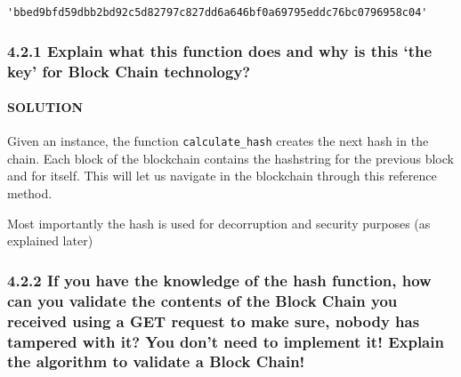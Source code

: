 \documentclass[11pt]{article}
\makeatletter
\newcommand{\boxspacing}{\kern\kvtcb@left@rule\kern\kvtcb@boxsep}
\newcommand{\prompt}[4]{
        {\ttfamily\llap{{\color{#2}[#3]:\hspace{3pt}#4}}\vspace{-\baselineskip}}
    }
\makeatother
\begin{document}
            \begin{tcolorbox}[breakable, size=fbox, boxrule=.5pt, pad at break*=1mm, opacityfill=0]
\prompt{Out}{outcolor}{35}{\boxspacing}
\begin{Verbatim}[commandchars=\\\{\}]
'bbed9bfd59dbb2bd92c5d82797c827dd6a646bf0a69795eddc76bc0796958c04'
\end{Verbatim}
\end{tcolorbox}
        
    \hypertarget{explain-what-this-function-does-and-why-is-this-the-key-for-block-chain-technology}{%
\subsubsection{4.2.1 Explain what this function does and why is this
`the key' for Block Chain
technology?}\label{explain-what-this-function-does-and-why-is-this-the-key-for-block-chain-technology}}

    \hypertarget{solution}{%
\paragraph{SOLUTION}\label{solution}}

Given an instance, the function \texttt{calculate\_hash} creates the
next hash in the chain. Each block of the blockchain contains the
hashstring for the previous block and for itself. This will let us
navigate in the blockchain through this reference method.

Most importantly the hash is used for decorruption and security purposes
(as explained later)

    \hypertarget{if-you-have-the-knowledge-of-the-hash-function-how-can-you-validate-the-contents-of-the-block-chain-you-received-using-a-get-request-to-make-sure-nobody-has-tampered-with-it-you-dont-need-to-implement-it-explain-the-algorithm-to-validate-a-block-chain}{%
\subsubsection{4.2.2 If you have the knowledge of the hash function, how
can you validate the contents of the Block Chain you received using a
GET request to make sure, nobody has tampered with it? You don't need to
implement it! Explain the algorithm to validate a Block
Chain!}\label{if-you-have-the-knowledge-of-the-hash-function-how-can-you-validate-the-contents-of-the-block-chain-you-received-using-a-get-request-to-make-sure-nobody-has-tampered-with-it-you-dont-need-to-implement-it-explain-the-algorithm-to-validate-a-block-chain}}
\end{document}
